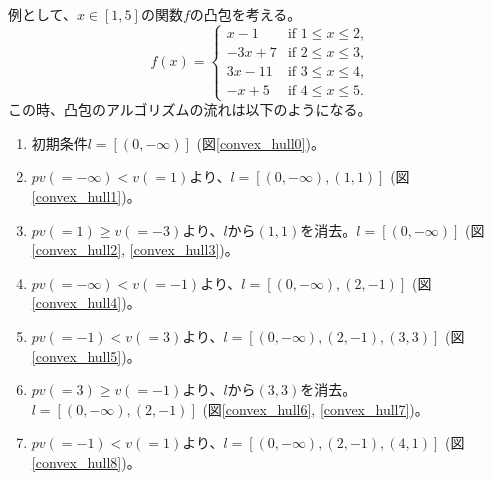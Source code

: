 例として、$x \in [1,5]$の関数$f$の凸包を考える。
\begin{equation*}
    f(x)=
    \begin{cases}
        x - 1 & \text{if $1 \le x \le 2$,} \\
        -3x + 7 & \text{if $2 \le x \le 3$,} \\
        3x - 11 & \text{if $3 \le x \le 4$,} \\
        -x + 5 & \text{if $4 \le x \le 5$.}
    \end{cases}
\end{equation*}
この時、凸包のアルゴリズムの流れは以下のようになる。
\begin{enumerate}
    \item 初期条件$l = [(0, -\infty)]$ (図\ref{convex_hull0})。
    \item $pv(=- \infty) < v(=1)$より、$l = [(0, -\infty), (1,1)]$ (図\ref{convex_hull1})。
    \item $pv(= 1) \ge v(=-3)$より、$l$から$(1, 1)$を消去。$l = [(0, -\infty)]$ (図\ref{convex_hull2}, \ref{convex_hull3})。
    \item $pv(=- \infty) < v(=-1)$より、$l = [(0, -\infty), (2,-1)]$ (図\ref{convex_hull4})。
    \item $pv(=- 1) < v(=3)$より、$l = [(0, -\infty), (2,-1), (3,3)]$ (図\ref{convex_hull5})。
    \item $pv(= 3) \ge v(=-1)$より、$l$から$(3, 3)$を消去。$l = [(0, -\infty), (2,-1)]$ (図\ref{convex_hull6}, \ref{convex_hull7})。
    \item $pv(=- 1) < v(=1)$より、$l = [(0, -\infty), (2,-1), (4,1)]$ (図\ref{convex_hull8})。
\end{enumerate}

